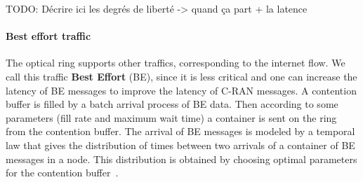 \documentclass[]{algotel}
\newcommand{\todo}[1]{{\color{red} TODO: {#1}}}
\begin{document}
%    
%   

% 
% 

\todo{Décrire ici les degrés de liberté -> quand ça part + la latence}


\paragraph{Best effort traffic}

The optical ring supports other traffics, corresponding to the internet flow. We call this traffic \textbf{Best Effort} (BE), since it is less critical and one can increase the latency of BE messages to improve the latency of C-RAN messages. 
A contention buffer is filled by a batch arrival process of BE data. Then according to some parameters (fill rate and maximum wait time) a container is sent on the ring from the contention buffer. The arrival of BE messages is modeled by a temporal law that gives the distribution of times between two arrivals of a container of BE messages in a node. This distribution is obtained by choosing optimal parameters for the contention buffer~\cite{}. 

% 
% 
%   
\end{document}
